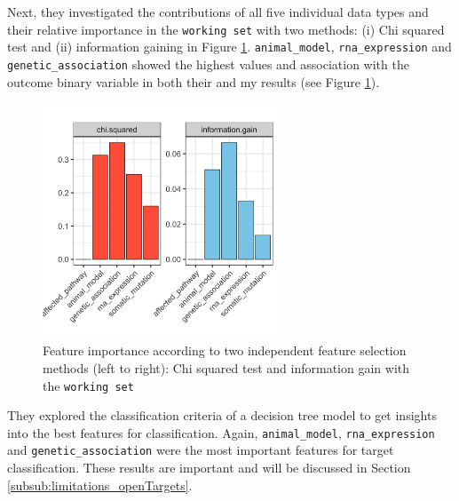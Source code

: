 Next, they investigated the contributions of all five individual data types and their relative importance in the \texttt{working set} with two methods: (i) Chi squared test and (ii) information gaining in Figure \ref{fig:OT_features}. \texttt{animal\_model}, \texttt{rna\_expression} and \texttt{genetic\_association} showed the highest values and association with the outcome binary variable in both their and my results (see Figure \ref{fig:OT_features}).

\begin{figure}[H]
\centering
    \includegraphics[width=7cm]{pics/Features.png}
    \caption{Feature importance according to two independent feature selection methods (left to right): Chi squared test and information gain with the \texttt{working set}}
    \label{fig:OT_features}
\end{figure}

They explored the classification criteria of a decision tree model to get insights into the best features for classification. Again, \texttt{animal\_model}, \texttt{rna\_expression} and \texttt{genetic\_association} were the most important features for target classification. These results are important and will be discussed in Section \ref{subsub:limitations_openTargets}.

